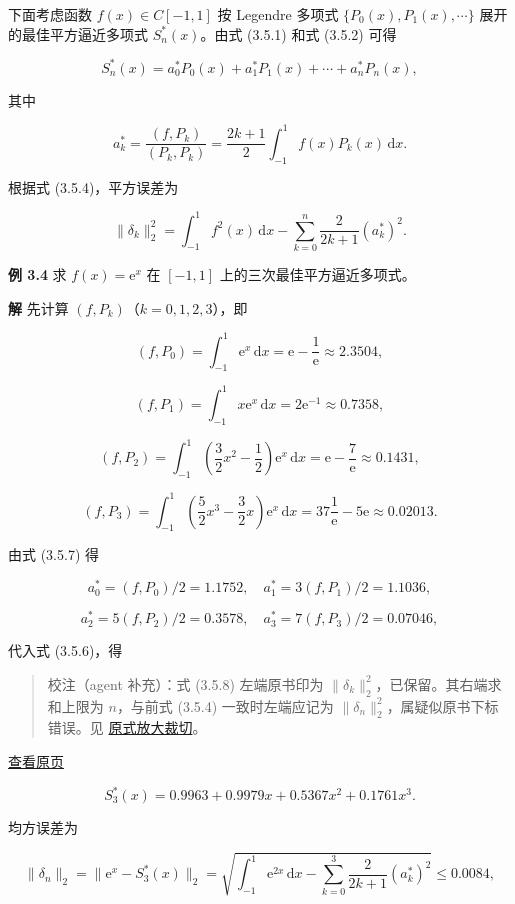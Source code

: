 \documentclass[
  10pt,
  fontset=fandol]{ctexart}
\begin{document}
下面考虑函数 \(f(x)\in C[-1,1]\) 按 Legendre 多项式 \(\{P_0(x),P_1(x),\cdots\}\) 展开的最佳平方逼近多项式 \(S_n^*(x)\)。由式 (3.5.1) 和式 (3.5.2) 可得

\[
S_n^*(x)=a_0^*P_0(x)+a_1^*P_1(x)+\cdots+a_n^*P_n(x),\tag{3.5.6}
\]

其中

\[
a_k^*=\frac{(f,P_k)}{(P_k,P_k)}=\frac{2k+1}{2}\int_{-1}^1f(x)P_k(x)\,\mathrm dx.\tag{3.5.7}
\]

根据式 (3.5.4)，平方误差为

\[
\|\delta_k\|_2^2=\int_{-1}^1 f^2(x)\,\mathrm dx-\sum_{k=0}^n\frac{2}{2k+1}(a_k^*)^2.\tag{3.5.8}
\]

\textbf{例 3.4} 求 \(f(x)=\mathrm e^x\) 在 \([-1,1]\) 上的三次最佳平方逼近多项式。

\textbf{解} 先计算 \((f,P_k)\)（\(k=0,1,2,3\)），即

\[
(f,P_0)=\int_{-1}^1\mathrm e^x\,\mathrm dx=\mathrm e-\frac1{\mathrm e}\approx2.3504,
\]

\[
(f,P_1)=\int_{-1}^1x\mathrm e^x\,\mathrm dx=2\mathrm e^{-1}\approx0.7358,
\]

\[
(f,P_2)=\int_{-1}^1\left(\frac32x^2-\frac12\right)\mathrm e^x\,\mathrm dx=\mathrm e-\frac7{\mathrm e}\approx0.1431,
\]

\[
(f,P_3)=\int_{-1}^1\left(\frac52x^3-\frac32x\right)\mathrm e^x\,\mathrm dx=37\frac1{\mathrm e}-5\mathrm e\approx0.02013.
\]

由式 (3.5.7) 得

\[
a_0^*=(f,P_0)/2=1.1752,\quad a_1^*=3(f,P_1)/2=1.1036,
\]

\[
a_2^*=5(f,P_2)/2=0.3578,\quad a_3^*=7(f,P_3)/2=0.07046,
\]

代入式 (3.5.6)，得

\begin{quote}
校注（agent 补充）：式 (3.5.8) 左端原书印为 \(\|\delta_k\|_2^2\)，已保留。其右端求和上限为 \(n\)，与前式 (3.5.4) 一致时左端应记为 \(\|\delta_n\|_2^2\)，属疑似原书下标错误。见 \href{../assets/ch03b/p077-error-formula.png}{原式放大裁切}。
\end{quote}

\href{../../source-images/pdf-078.jpeg}{查看原页}

\[
S_3^*(x)=0.9963+0.9979x+0.5367x^2+0.1761x^3.
\]

均方误差为

\[
\|\delta_n\|_2=\|\mathrm e^x-S_3^*(x)\|_2=\sqrt{\int_{-1}^1\mathrm e^{2x}\,\mathrm dx-\sum_{k=0}^3\frac{2}{2k+1}(a_k^*)^2}\leqslant0.0084,
\]
\end{document}

